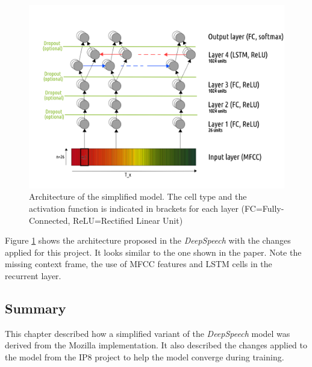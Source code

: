 \begin{figure}[h!]
	\includegraphics[width=\linewidth]{./img/model_architecture.png}
	\caption{Architecture of the simplified model. The cell type and the activation function is indicated in brackets for each layer (FC=Fully-Connected, ReLU=Rectified Linear Unit)}
	\label{model_architecture}
\end{figure}

Figure \ref{model_architecture} shows the architecture proposed in the \textit{DeepSpeech} with the changes applied for this project. It looks similar to the one shown in the paper. Note the missing context frame, the use of \ac{MFCC} features and \ac{LSTM} cells in the recurrent layer.

\clearpage
\subsection{Summary}

This chapter described how a simplified variant of the \textit{DeepSpeech} model was derived from the Mozilla implementation. It also described the changes applied to the model from the IP8 project to help the model converge during training.